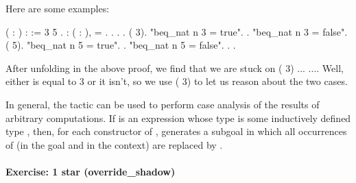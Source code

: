 \documentclass[12pt]{report}
\begin{document}
    Here are some examples: \begin{coqdoccode}
\coqdocemptyline
\coqdocnoindent
{}  ( : ) :  :=\coqdoceol
\coqdocindent{1.00em}
   3  \coqdoceol
\coqdocindent{1.00em}
    5  \coqdoceol
\coqdocindent{1.00em}
 .\coqdoceol
\coqdocemptyline
\coqdocnoindent
{}  : \coqdockw{\ensuremath{\forall}} ( : ),\coqdoceol
\coqdocindent{1.00em}
  = .\coqdoceol
\coqdocnoindent
{}.\coqdoceol
\coqdocindent{1.00em}
 .  .\coqdoceol
\coqdocindent{1.00em}
 (  3).\coqdoceol
\coqdocindent{2.00em}
 "beq\_nat n 3 = true". .\coqdoceol
\coqdocindent{2.00em}
 "beq\_nat n 3 = false".  (  5).\coqdoceol
\coqdocindent{3.00em}
 "beq\_nat n 5 = true". .\coqdoceol
\coqdocindent{3.00em}
 "beq\_nat n 5 = false". . .\coqdoceol
\coqdocemptyline
\end{coqdoccode}
After unfolding  in the above proof, we find that
    we are stuck on  (  3)  ...  ....  Well,
    either  is equal to 3 or it isn't, so we use 
    (  3) to let us reason about the two cases. 


    In general, the  tactic can be used to perform case
    analysis of the results of arbitrary computations.  If  is an
    expression whose type is some inductively defined type , then,
    for each constructor  of ,   generates a subgoal
    in which all occurrences of  (in the goal and in the context)
    are replaced by .




\paragraph{Exercise: 1 star (override\_shadow)}
\end{document}
